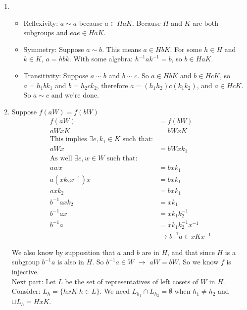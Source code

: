 \documentclass[12pt]{report}
\begin{document}
\begin{enumerate}
  \item \begin{itemize}
        \item Reflexivity: $a \sim a$ because $a \in HaK$. Because $H$ and $K$
              are both subgroups and $eae \in HaK$.
        \item Symmetry: Suppose $a \sim b$. This means $a \in HbK$. For some $h
              \in H$ and $k \in K$, $a = hbk$. With some algebra: $h^{-1}ak^{-1}
               = b$, so $b \in HaK$.
        \item Transitivity: Suppose $a \sim b$ and $b \sim c$. So $a \in HbK$
              and $b \in HcK$, so $a = h_1bk_1$ and $b = h_2ck_2$, therefore
              $a = (h_1h_2)c(k_1k_2)$, and $a \in HcK$. So $a \sim c$ and we're
              done.
        \end{itemize}
  \item Suppose $f(aW) = f(bW)$
        \begin{align*}
          f(aW) &= f(bW) \\
           aWxK &= bWxK \\
        \textrm{This implies $\exists e,k_1 \in K$ such that:} &\\
            aWx &= bWxk_1 \\
        \textrm{As well $\exists e,w \in W$ such that:} &\\
            awx &= bxk_1 \\
            a(xk_2x^{-1})x &= bxk_1 \\
            axk_2 &= bxk_1 \\
            b^{-1}axk_2 &=xk_1 \\
            b^{-1}ax &= xk_1k_2^{-1}\\
            b^{-1}a &= xk_1k_2^{-1}x^{-1}\\
            &\to b^{-1}a \in xKx^{-1}
        \end{align*}

        We also know by supposition that $a$ and $b$ are in $H$, and that since
        $H$ is a subgroup $b^{-1}a$ is also in $H$. So $b^{-1}a \in W$ $\to$ $aW
        = bW$. So we know $f$ is injective.\\

        Next part: Let $L$ be the set of representatives of left cosets of $W$
        in $H$. Consider: $L_h = \{ hxK |  h \in L\}$. We need $L_{h_1} \cap
        L_{h_2} = \emptyset$ when $h_1 \neq h_2$ and $\cup L_h = HxK$.\\


\end{enumerate}
\end{document}
